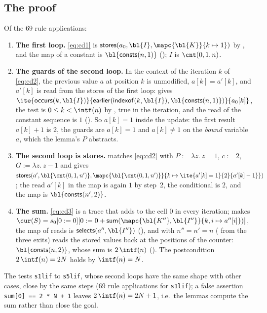 \subsection{The proof}
Of the 69 rule applications:
\begin{enumerate}[nosep]
\item \textbf{The first loop.} \eqref{eq:cd1} is $\mathsf{stores}(a_0, \bl{I}, \mapc{\bl{K}}{k \mapsto 1})$ by
  , and the map of a constant is $\bl{\mathsf{consts}(n, 1)}$ (); $I$
  is $\cnt(0, 1, n)$.
\item \textbf{The guards of the second loop.} In the context of the iteration $k$ of \eqref{eq:cd2}, the
  previous value $a$ at position $k$ is unmodified, $a[k] = a'[k]$, and $a'[k]$ is read from the stores of the
  first loop:  gives
  $\ite{\mathsf{occurs}(k, \bl{I})}{\mathsf{earlier}(\mathsf{indexof}(k, \bl{I}), \bl{\mathsf{consts}(n, 1)})}{a_0[k]}$,
  the test is $0 \le k < \intf(n)$ by , true in the iteration, and the read of the
  constant sequence is $1$ (). So $a[k] = 1$ inside the update: the first result
  $a[k] + 1$ is $2$, the guards are $a[k] = 1$ and $a[k] \ne 1$ on the \emph{bound} variable $a$, which the
  lemma's $P$ abstracts.
\item \textbf{The second loop is stores.}  matches \eqref{eq:cd2} with
  $P := \lambda z.\ z = 1$, $c := 2$, $G := \lambda z.\ z - 1$ and gives
  $\mathsf{stores}(a', \bl{\cnt(0, 1, n')}, \mapc{\bl{\cnt(0, 1, n')}}{k \mapsto \ite{a'[k] = 1}{2}{a'[k] - 1}})$;
  the read $a'[k]$ in the map is again $1$ by step~2, the conditional is $2$, and the map is
  $\bl{\mathsf{consts}(n', 2)}$.
\item \textbf{The sum.} \eqref{eq:cd3} is a trace that adds to the cell $0$ in every iteration;
   makes $\cur(S) = s_0[0 := 0][0 := 0 + \mathsf{sum}(\mapc{\bl{K''}, \bl{I''}}{k, i \mapsto a''[i]})]$,
  the map of reads is $\mathsf{selects}(a'', \bl{I''})$ (), and with $n'' = n' = n$
  ( from the three exits)  reads the stored values
  back at the positions of the counter: $\bl{\mathsf{consts}(n, 2)}$, whose sum is $2\,\intf(n)$
  (). The postcondition $2\,\intf(n) = 2N$ holds by $\intf(n) = N$.
\end{enumerate}
The tests \texttt{s1lif} to \texttt{s5lif}, whose second loops have the same shape with other cases, close by
the same steps (69 rule applications for \texttt{s1lif}); a false assertion \texttt{sum[0] == 2 * N + 1}
leaves $2\,\intf(n) = 2N + 1$, i.e.\ the lemmas compute the sum rather than close the goal.

